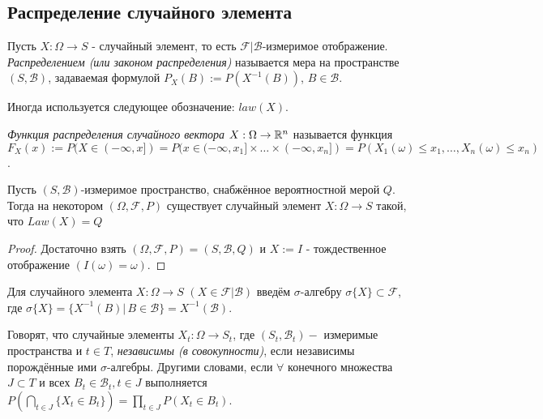 \subsection{Распределение случайного элемента}
\begin{definition}\label{lect05:def5}
	Пусть $X: \Omega \to S$ - случайный элемент, то есть $\mathcal{F}|\mathcal{B}$-измеримое отображение. \textit{Распределением (или законом распределения)} называется мера на пространстве $(S, \mathcal{B})$, задаваемая формулой $P_X(B) := P(X^{-1}(B))$, $B\in \mathcal{B}$. 
	
	Иногда используется следующее обозначение: $law(X)$.
\end{definition}
\begin{definition}\label{lect05:def6}
	\textit{Функция распределения случайного вектора} $X: \Omega \to \mathbb{R}^n$ называется функция $F_X(x) := P(X \in (-\infty, x]) = P(x \in (-\infty, x_1]\times \dots \times (-\infty, x_n]) = P(X_1(\omega) \leq x_1, \dots, X_n(\omega) \leq x_n)$.
\end{definition}
\begin{nb}\label{lect05:nb2}
	Пусть  $(S, \mathcal{B})$-измеримое пространство, снабжённое вероятностной мерой $Q$. Тогда на некотором $(\Omega, \mathcal{F}, P)$ существует случайный элемент $X: \Omega \to S$ такой, что $Law(X) = Q$
\end{nb}
\begin{proof}
	Достаточно взять $(\Omega, \mathcal{F}, P) = (S, \mathcal{B}, Q)$ и $X := I$ - тождественное отображение $(I(\omega) = \omega)$.
\end{proof}

Для случайного элемента $X: \Omega \to S$ $(X \in \mathcal{F}|\mathcal{B})$ введём $\sigma$-алгебру $\sigma \{X \} \subset \mathcal{F}$, где $\sigma \{X \} = \{ X^{-1}(B) | \, B\in \mathcal{B} \} = X^{-1}(\mathcal{B})$.
\begin{definition}\label{lect05:def7}
	Говорят, что случайные элементы $X_t: \Omega \to S_t$, где $(S_t, \mathcal{B}_t) -$ измеримые пространства и $t \in T$, \textit{независимы (в совокупности)}, если независимы порождённые ими $\sigma$-алгебры. Другими словами, если $\forall$ конечного множества $J \subset T$ и всех $B_t \in \mathcal{B}_t, t\in J$ выполняется $P(\bigcap \limits_{t \in J} \{ X_t \in B_t\}) = \prod \limits_{t \in J} P(X_t \in B_t)$.
\end{definition}

